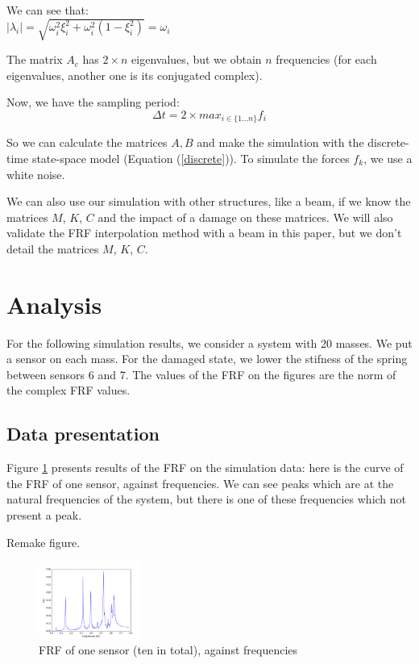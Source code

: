 \documentclass[journal]{IEEEtran}
\begin{document}
\begin{remark}
We can see that:\\
$|\lambda_i| = \sqrt{\omega_i^2 \xi_i^2 + \omega_i^2 (1 - \xi_i^2)} = \omega_i$
\end{remark}

\begin{remark}
The matrix $A_c$ has $2 \times n$ eigenvalues, but we obtain $n$ frequencies (for each eigenvalues, another one is its conjugated complex).
\end{remark}

Now, we have the sampling period:
\begin{equation}
\Delta t = 2 \times max_{i \in \{1 ... n\} } f_i
\end{equation}

So we can calculate the matrices $A, B$ and make the simulation with the discrete-time state-space model (Equation (\ref{discrete})). To simulate the forces $f_k$, we use a white noise.


We can also use our simulation with other structures, like a beam, if we know the matrices $M$, $K$, $C$ and the impact of a damage on these matrices.
We will also validate the FRF interpolation method with a beam in this paper, but we don't detail the matrices $M$, $K$, $C$.


\section{Analysis}

For the following simulation results, we consider a system with 20 masses. We put a sensor on each mass. For the damaged state, we lower the stifness of the spring between sensors 6 and 7. The values of the FRF on the figures are the norm of the complex FRF values.


\subsection{Data presentation}

Figure \ref{frf_freq} presents results of the FRF on the simulation data: here is the curve of the FRF of one sensor, against frequencies. We can see peaks which are at the natural frequencies of the system, but there is one of these frequencies which not present a peak.

Remake figure.

\begin{figure}[h!]
  \centering
  \includegraphics[width=0.3\textwidth]{images/persensor1.png}
  \caption{FRF of one sensor (ten in total), against frequencies}
  \label{frf_freq}
\end{figure}
\end{document}
